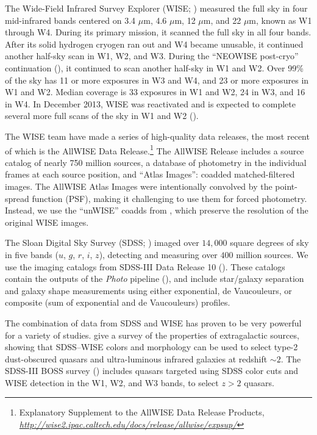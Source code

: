 \documentclass[12pt,preprint]{aastex}
\newcommand{\niceurl}[1]{\href{#1}{\textsl{#1}}}
\newcommand{\thou}{,\!000}
\renewcommand{\micron}{$\mu$m}
\begin{document}
The Wide-Field Infrared Survey Explorer (WISE; \citealt{wright})
measured the full sky in four mid-infrared bands centered on 3.4
\micron, 4.6 \micron, 12 \micron, and 22 \micron, known as W1 through
W4.  During its primary mission, it scanned the full sky in all four
bands.  After its solid hydrogen cryogen ran out and W4 became
unusable, it continued another half-sky scan in W1, W2, and W3.
During the ``NEOWISE post-cryo'' continuation (\citealt{mainzer}), it
continued to scan another half-sky in W1 and W2.  Over 99\% of the sky
has 11 or more exposures in W3 and W4, and 23 or more exposures in W1
and W2.  Median coverage is 33 exposures in W1 and W2, 24 in W3, and
16 in W4.
In December 2013, WISE was reactivated and is expected to
complete several more full scans of the sky in W1 and W2 (\citealt{mainzer2014}).


The WISE team have made a series of high-quality data releases, the
most recent of which is the AllWISE Data Release.\footnote{Explanatory
  Supplement to the AllWISE Data Release Products, 
  \niceurl{http://wise2.ipac.caltech.edu/docs/release/allwise/expsup/}}
The AllWISE Release includes a source catalog of nearly 750 million
sources, a database of photometry in the individual frames at each
source position, and ``Atlas Images'': coadded matched-filtered
images.
%
The AllWISE Atlas Images were intentionally convolved by the
point-spread function (PSF), making it challenging to use them for
forced photometry.  Instead, we use the ``unWISE'' coadds from
\citet{unwise}, which preserve the resolution of the original WISE
images.


The Sloan Digital Sky Survey (SDSS; \citealt{york}) imaged over
$14\thou$ square degrees of sky in five bands ($u$, $g$, $r$, $i$, $z$), detecting and
measuring over $400$ million sources.  We use the imaging catalogs
from SDSS-III Data Release 10 (\citealt{sdss3, dr10}).  These catalogs
contain the outputs of the \emph{Photo} pipeline (\citealt{lupton}),
and include star/galaxy separation and galaxy shape measurements using
either exponential, de Vaucouleurs, or composite (sum of exponential
and de Vaucouleurs) profiles.


The combination of data from SDSS and WISE has proven to be very
powerful for a variety of studies.  \citet{yan} give a survey of the
properties of extragalactic sources, showing that SDSS--WISE colors and
morphology can be used to select type-2 dust-obscured quasars and
ultra-luminous infrared galaxies at redshift $\sim2$.
%
The SDSS-III BOSS survey (\citealt{boss}) includes quasars targeted using
SDSS color cuts and WISE detection in the W1, W2, and W3 bands, to select $z>2$ quasars.
%
\end{document}
